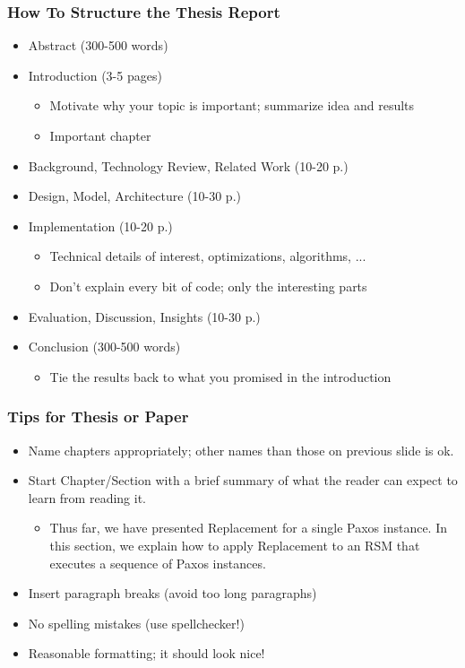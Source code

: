 \documentclass[hyperref={pdfpagelabels=false,linkcolor=blue}, aspectratio=1610]{beamer}
\begin{document}
\begin{frame}
\frametitle{How To Structure the Thesis Report}
\begin{block}{}
 \begin{itemize}
  \item Abstract (300-500 words)
  \item Introduction (3-5 pages)
  \begin{itemize}
  	\item Motivate why your topic is important; summarize idea and results
	\item Important chapter
  \end{itemize}
  \item Background, Technology Review, Related Work (10-20 p.)
  \item Design, Model, Architecture (10-30 p.)
  \item Implementation (10-20 p.)
  \begin{itemize}
   \item Technical details of interest, optimizations, algorithms, ...
   \item Don't explain every bit of code; only the interesting parts
  \end{itemize}
  \item Evaluation, Discussion, Insights (10-30 p.)
  \item Conclusion (300-500 words)
  \begin{itemize}
  	\item Tie the results back to what you promised in the introduction
  \end{itemize}
 \end{itemize}
\end{block}
\end{frame}

\begin{frame}
\frametitle{Tips for Thesis or Paper}
\begin{block}{}
 \begin{itemize}
  \item Name chapters appropriately; other names than those on previous slide is ok.
  \item Start Chapter/Section with a brief summary of what the reader can expect to learn from reading it.
  \begin{itemize}
   \item Thus far, we have presented Replacement for a single Paxos instance. In this section, we explain how to apply Replacement to an RSM that executes a sequence of Paxos instances.
  \end{itemize}
  \item Insert paragraph breaks (avoid too long paragraphs)
  \item No spelling mistakes (use spellchecker!)
  \item Reasonable formatting; it should look nice!
 \end{itemize}
\end{block}
\end{frame}
\end{document}
